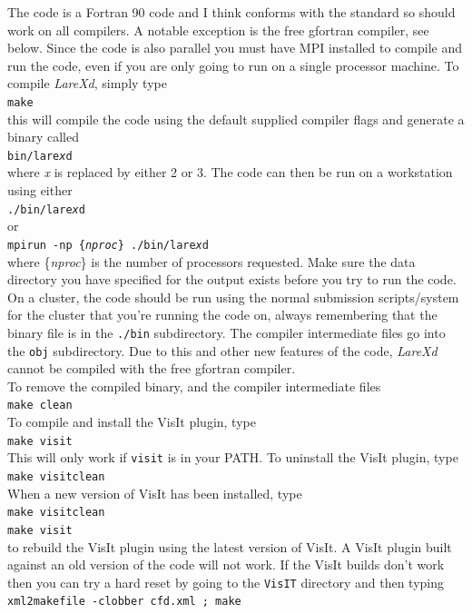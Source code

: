 \documentclass[11pt]{article}
\begin{document}
The code is a Fortran 90 code and I think conforms with the standard so should work on all compilers. A notable exception is the free gfortran compiler, see below. Since the code is also parallel you must have MPI installed to compile and run the code, even if you are only going to run on a single processor machine.
To compile {\it LareXd}, simply type\\
\texttt{make}\\
this will compile the code using the default supplied compiler flags and generate a binary called\\
\texttt{bin/lare{\it x}d}\\
where {\it x} is replaced by either 2 or 3. The code can then be run on a workstation using either\\
\texttt{./bin/lare{\it x}d}\\
or\\
\texttt{mpirun -np \{{\it nproc}\} ./bin/lare{\it x}d}\\
where \{{\it nproc}\} is the number of processors requested. Make sure the data directory you have specified for the output exists
before you try to run the code. On a cluster, the
code should be run using the normal submission scripts/system for the cluster
that you're running the code on, always remembering that the binary file is in
the \texttt{./bin} subdirectory. The compiler intermediate files go into the
\texttt{obj} subdirectory. Due to this and other new features of the code,
{\it LareXd} cannot be compiled with the free gfortran compiler.\\

To remove the compiled binary, and the compiler intermediate files\\
\texttt{make clean}\\
To compile and install the VisIt plugin, type\\
\texttt{make visit}\\
This will only work if \texttt{visit} is in your PATH. To uninstall the VisIt plugin, type\\
\texttt{make visitclean}\\
When a new version of VisIt has been installed, type\\
\texttt{make visitclean}\\
\texttt{make visit}\\
to rebuild the VisIt plugin using the latest version of VisIt. A VisIt plugin built against an old version of the code will not work. If the VisIt builds don't work then you can try a hard reset by going to the \texttt{VisIT} directory and then typing\\
 \texttt{xml2makefile -clobber cfd.xml ; make}
\end{document}
